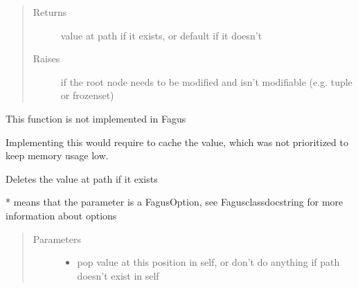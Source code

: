 \documentclass[a4paper,10pt,english]{sphinxmanual}
\begin{document}
\begin{fulllineitems}
\begin{fulllineitems}
\begin{quote}
\begin{description}
\begin{itemize}
\end{itemize}

\item[{Returns}] \leavevmode
\sphinxAtStartPar
value at path if it exists, or default if it doesn’t

\item[{Raises}] \leavevmode
\sphinxAtStartPar
{} \textendash{} if the root node needs to be modified and isn’t modifiable (e.g. tuple or frozenset)

\end{description}\end{quote}

\end{fulllineitems}


\begin{fulllineitems}
\label{\detokenize{fagus:fagus.Fagus.popitem}}
\pysigstartsignatures
{}
\pysigstopsignatures
\sphinxAtStartPar
This function is not implemented in Fagus

\sphinxAtStartPar
Implementing this would require to cache the value, which was not prioritized to keep memory usage low.

\end{fulllineitems}


\begin{fulllineitems}
\label{\detokenize{fagus:fagus.Fagus.discard}}
\pysigstartsignatures
{}
\pysigstopsignatures
\sphinxAtStartPar
Deletes the value at path if it exists

\sphinxAtStartPar
* means that the parameter is a FagusOption, see Fagus\sphinxhyphen{}class\sphinxhyphen{}docstring for more information about options
\begin{quote}\begin{description}
\item[{Parameters}] \leavevmode\begin{itemize}
\item {}
\sphinxAtStartPar
{} \textendash{} pop value at this position in self, or don’t do anything if path doesn’t exist in self


\end{itemize}
\end{description}
\end{quote}
\end{fulllineitems}
\end{fulllineitems}
\end{document}
